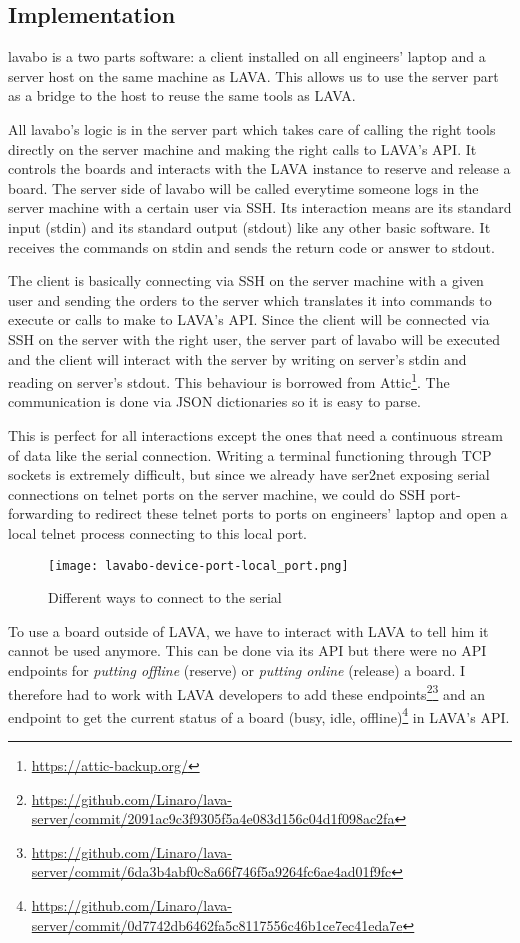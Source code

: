 \subsection{Implementation}

lavabo is a two parts software: a client installed on all engineers' laptop and a server host on the same machine as LAVA. This allows us to use the server part as a bridge to the host to reuse the same tools as LAVA.

All lavabo's logic is in the server part which takes care of calling the right tools directly on the server machine and making the right calls to LAVA's API. It controls the boards and interacts with the LAVA instance to reserve and release a board. The server side of lavabo will be called everytime someone logs in the server machine with a certain user via SSH. Its interaction means are its standard input (stdin) and its standard output (stdout) like any other basic software. It receives the commands on stdin and sends the return code or answer to stdout.

The client is basically connecting via SSH on the server machine with a given user and sending the orders to the server which translates it into commands to execute or calls to make to LAVA's API. Since the client will be connected via SSH on the server with the right user, the server part of lavabo will be executed and the client will interact with the server by writing on server's stdin and reading on server's stdout. This behaviour is borrowed from Attic\footnote{\url{https://attic-backup.org/}}. The communication is done via JSON dictionaries so it is easy to parse.

This is perfect for all interactions except the ones that need a continuous stream of data like the serial connection. Writing a terminal functioning through TCP sockets is extremely difficult, but since we already have ser2net exposing serial connections on telnet ports on the server machine, we could do SSH port-forwarding to redirect these telnet ports to ports on engineers' laptop and open a local telnet process connecting to this local port.

\begin{figure}[H]
  \texttt{[image: lavabo-device-port-local\_port.png]}
  \caption{Different ways to connect to the serial}
\end{figure}

To use a board outside of LAVA, we have to interact with LAVA to tell him it cannot be used anymore. This can be done via its API but there were no API endpoints for \textit{putting offline} (reserve) or \textit{putting online} (release) a board. I therefore had to work with LAVA developers to add these endpoints\footnote{\url{https://github.com/Linaro/lava-server/commit/2091ac9c3f9305f5a4e083d156c04d1f098ac2fa}}\footnote{\url{https://github.com/Linaro/lava-server/commit/6da3b4abf0c8a66f746f5a9264fc6ae4ad01f9fc}} and an endpoint to get the current status of a board (busy, idle, offline)\footnote{\url{https://github.com/Linaro/lava-server/commit/0d7742db6462fa5c8117556c46b1ce7ec41eda7e}} in LAVA's API.

